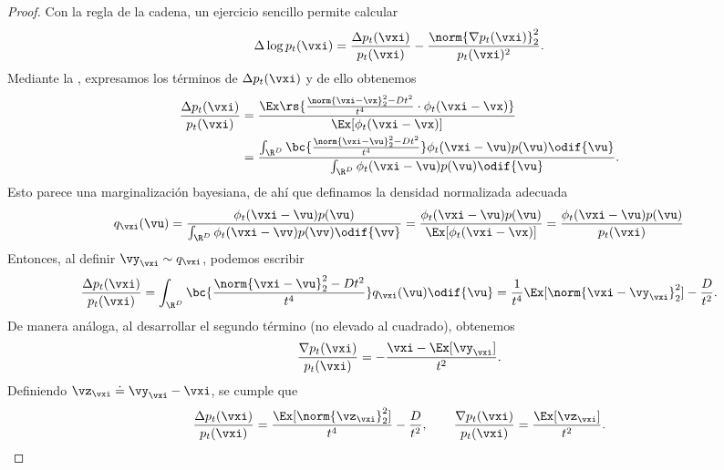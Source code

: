 \documentclass[../../book-main_es.tex]{subfiles}
\begin{document}
\begin{proof}
    Con la regla de la cadena, un ejercicio sencillo permite calcular
    \begin{equation}
        \Delta \log p_{t}(\vxi) = \frac{\Delta
        p_{t}(\vxi)}{p_{t}(\vxi)} - \frac{\norm{\nabla
        p_{t}(\vxi)}_{2}^{2}}{p_{t}(\vxi)^{2}}.
    \end{equation}
    Mediante la , expresamos los términos de \(\Delta
    p_{t}(\vxi)\) y de ello obtenemos
    \begin{align}
        \frac{\Delta p_{t}(\vxi)}{p_{t}(\vxi)}
        &= \frac{\Ex\rs{\frac{\norm{\vxi - \vx}_{2}^{2} -
        Dt^{2}}{t^{4}} \cdot \phi_{t}(\vxi - \vx)}}{\Ex[\phi_{t}(\vxi
        - \vx)]} \\
        &= \frac{\int_{\R^{D}}\bc{\frac{\norm{\vxi - \vu}_{2}^{2} -
            Dt^{2}}{t^{4}}}\phi_{t}(\vxi -
        \vu)p(\vu)\odif{\vu}}{\int_{\R^{D}}\phi_{t}(\vxi -
        \vu)p(\vu)\odif{\vu}}.
    \end{align}
    Esto parece una marginalización bayesiana, de ahí que definamos la
    densidad normalizada adecuada
    \begin{equation}
        q_{\vxi}(\vu) = \frac{\phi_{t}(\vxi -
        \vu)p(\vu)}{\int_{\R^{D}}\phi_{t}(\vxi -
        \vv)p(\vv)\odif{\vv}} = \frac{\phi_{t}(\vxi -
        \vu)p(\vu)}{\Ex[\phi_{t}(\vxi - \vx)]} = \frac{\phi_{t}(\vxi
        - \vu)p(\vu)}{p_{t}(\vxi)}
    \end{equation}
    Entonces, al definir \(\vy_{\vxi} \sim q_{\vxi}\), podemos escribir
    \begin{equation}
        \frac{\Delta p_{t}(\vxi)}{p_{t}(\vxi)} =
        \int_{\R^{D}}\bc{\frac{\norm{\vxi - \vu}_{2}^{2} -
        Dt^{2}}{t^{4}}}q_{\vxi}(\vu)\odif{\vu} =
        \frac{1}{t^{4}}\Ex[\norm{\vxi - \vy_{\vxi}}_{2}^{2}] - \frac{D}{t^{2}}.
    \end{equation}
    De manera análoga, al desarrollar el segundo término (no elevado al cuadrado), obtenemos
    \begin{equation}
        \frac{\nabla p_{t}(\vxi)}{p_{t}(\vxi)} = -\frac{\vxi -
        \Ex[\vy_{\vxi}]}{t^{2}}.
    \end{equation}
    Definiendo \(\vz_{\vxi} \doteq \vy_{\vxi} - \vxi\), se cumple que
    \begin{equation}
        \frac{\Delta p_{t}(\vxi)}{p_{t}(\vxi)} =
        \frac{\Ex[\norm{\vz_{\vxi}}_{2}^{2}]}{t^{4}} -
        \frac{D}{t^{2}}, \qquad \frac{\nabla
        p_{t}(\vxi)}{p_{t}(\vxi)} = \frac{\Ex[\vz_{\vxi}]}{t^{2}}.

\end{equation}
\end{proof}
\end{document}
